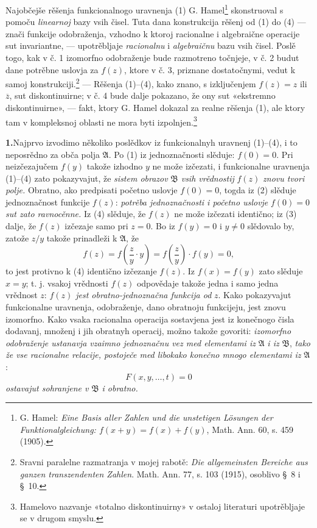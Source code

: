 \documentclass[11pt]{article}
\providecommand{\Afield}{\mathfrak A}
\providecommand{\Bfield}{\mathfrak B}
\begin{document}
Najobčejše rěšenja funkcionalnogo uravnenja (1) G. Hamel\footnote{G. Hamel: \emph{Eine Basis aller Zahlen und die unstetigen Lösungen der Funktionalgleichung: \(f(x+y)=f(x)+f(y)\)}, Math. Ann. 60, s. 459 (1905).} skonstruoval s pomoču {\itshape linearnoj} bazy vsih čisel. Tuta dana konstrukcija rěšenj od (1) do (4) --- znači funkcije odobraženja, vzhodno k ktoroj racionalne i algebraične operacije sut invariantne, --- upotrěbljaje {\itshape racionalnu} i {\itshape algebraičnu} bazu vsih čisel. Poslě togo, kak v č. 1 izomorfno odobraženje bude razmotreno točnjeje, v č. 2 budut dane potrěbne uslovja za \(f(z)\), ktore v č. 3, priznane dostatočnymi, vedut k samoj konstrukciji.\footnote{Sravni paralelne razmatranja v mojej rabotě: \emph{Die allgemeinsten Bereiche aus ganzen transzendenten Zahlen}. Math. Ann. 77, s. 103 (1915), osoblivo \S\ 8 i \S\ 10.} --- Rěšenja (1)--(4), kako znano, s izključenjem \(f(z)=z\) ili \(\overline z\), sut diskontinuirne; v č. 4 bude dalje pokazano, že ony sut «ekstremno diskontinuirne», --- fakt, ktory G. Hamel dokazal za realne rěšenja (1), ale ktory tam v kompleksnoj oblasti ne mora byti izpolnjen.\footnote{Hamelovo nazvanje «totalno diskontinuirny» v ostaloj literaturi upotrěbljaje se v drugom smyslu.}

\medskip
\noindent\textbf{1.}\quad Najprvo izvodimo několiko poslědkov iz funkcionalnyh uravnenj (1)--(4), i to neposrědno za obča polja \(\Afield\). Po (1) iz jednoznačnosti slěduje: \(f(0)=0\). Pri neizčezajučem \(f(y)\) takože izhodno \(y\) ne može izčezati, i funkcionalne uravnenja (1)--(4) zato pokazyvajut, že {\itshape sistem obrazov} \(\Bfield\) {\itshape vsih vrědnostij} \(f(z)\) {\itshape znovu tvori polje.} Obratno, ako predpisati početno uslovje \(f(0)=0\), togda iz (2) slěduje jednoznačnost funkcije \(f(z)\): {\itshape potrěba jednoznačnosti i početno uslovje} \(f(0)=0\) {\itshape sut zato ravnocěnne.} Iz (4) slěduje, že \(f(z)\) ne može izčezati identično; iz (3) dalje, že \(f(z)\) izčezaje samo pri \(z=0\). Bo iz \(f(y)=0\) i \(y\ne0\) slědovalo by, zatože \(z/y\) takože prinadleži k \(\Afield\), že
\[
f(z)=f\!\left(\frac{z}{y}\cdot y\right)=f\!\left(\frac{z}{y}\right)\cdot f(y)=0,
\]
to jest protivno k (4) identično izčezanje \(f(z)\). Iz \(f(x)=f(y)\) zato slěduje \(x=y\); t. j. vsakoj vrědnosti \(f(z)\) odpovědaje takože jedna i samo jedna vrědnost \(z\): {\itshape \(f(z)\) jest obratno-jednoznačna funkcija od} \(z\). Kako pokazyvajut funkcionalne uravnenja, odobraženje, dano obratnoju funkcijeju, jest znovu izomorfno. Kako vsaka racionalna operacija sostavjena jest iz konečnogo čisla dodavanj, množenj i jih obratnyh operacij, možno takože govoriti: {\itshape izomorfno odobraženje ustanavja vzaimno jednoznačnu vez med elementami iz} \(\Afield\) {\itshape i iz} \(\Bfield\), {\itshape tako že vse racionalne relacije, postoječe med libokako konečno mnogo elementami iz} \(\Afield\):
\[
F(x,y,\ldots,t)=0
\]
{\itshape ostavajut sohranjene v} \(\Bfield\) {\itshape i obratno.}
\end{document}
